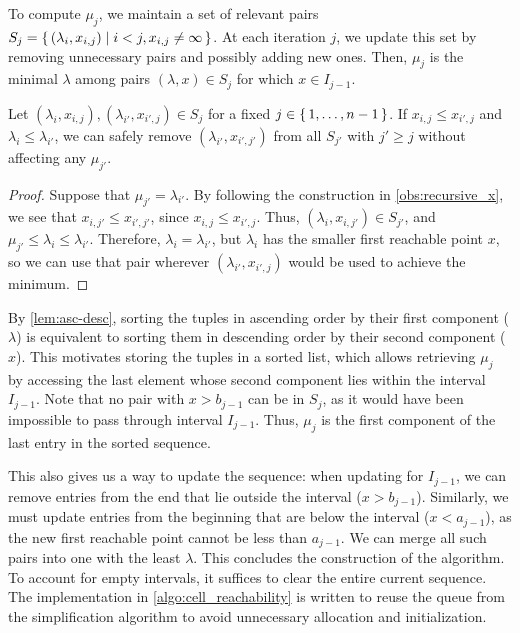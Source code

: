 To compute \(\mu_j\), we maintain a set of relevant pairs \(S_j = \set{(\lambda_i, x_{i, j}) \mid i < j, x_{i, j} \neq \infty}\). At each iteration \(j\), we update this set by removing unnecessary pairs and possibly adding new ones. Then, \(\mu_j\) is the minimal \(\lambda\) among pairs \((\lambda, x) \in S_j\) for which \(x \in I_{j-1}\).

\begin{lemma}\label{lem:asc-desc}
	Let \((\lambda_i, x_{i, j}), (\lambda_{i'}, x_{i', j}) \in S_j\) for a fixed \(j \in \set{1, \dots, n-1}\). If \(x_{i, j} \leq x_{i', j}\) and \(\lambda_i \leq \lambda_{i'}\), we can safely remove \((\lambda_{i'}, x_{i', j'})\) from all \(S_{j'}\) with \(j' \geq j\) without affecting any \(\mu_{j'}\).
\end{lemma}
\begin{proof}
	Suppose that \(\mu_{j'} = \lambda_{i'}\). By following the construction in \cref{obs:recursive_x}, we see that \(x_{i, j'} \leq x_{i', j'}\), since \(x_{i, j} \leq x_{i', j}\). Thus, \((\lambda_i, x_{i, j'}) \in S_{j'}\), and \(\mu_{j'} \leq \lambda_i \leq \lambda_{i'}\). Therefore, \(\lambda_i = \lambda_{i'}\), but \(\lambda_i\) has the smaller first reachable point \(x\), so we can use that pair wherever \((\lambda_{i'}, x_{i', j})\) would be used to achieve the minimum.
\end{proof}

By \cref{lem:asc-desc}, sorting the tuples in ascending order by their first component (\(\lambda\)) is equivalent to sorting them in descending order by their second component (\(x\)). This motivates storing the tuples in a sorted list, which allows retrieving \(\mu_j\) by accessing the last element whose second component lies within the interval \(I_{j-1}\). Note that no pair with \(x > b_{j-1}\) can be in \(S_j\), as it would have been impossible to pass through interval \(I_{j-1}\). Thus, \(\mu_j\) is the first component of the last entry in the sorted sequence.

This also gives us a way to update the sequence: when updating for \(I_{j-1}\), we can remove entries from the end that lie outside the interval (\(x > b_{j-1}\)). Similarly, we must update entries from the beginning that are below the interval (\(x < a_{j-1}\)), as the new first reachable point cannot be less than \(a_{j-1}\). We can merge all such pairs into one with the least \(\lambda\). This concludes the construction of the algorithm. To account for empty intervals, it suffices to clear the entire current sequence. The implementation in \cref{algo:cell_reachability} is written to reuse the queue from the simplification algorithm to avoid unnecessary allocation and initialization.


